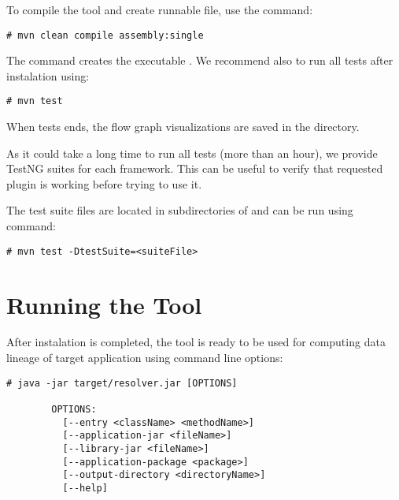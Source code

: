 To compile the \ToolName tool and create runnable  file, use the command:
\begin{lstlisting}[language=shell]
        # mvn clean compile assembly:single
\end{lstlisting}

The command creates the executable .
We recommend also to run all tests after instalation using:
\begin{lstlisting}[language=shell]
        # mvn test
\end{lstlisting}

When tests ends, the flow graph visualizations are saved in the  directory.

As it could take a long time to run all tests (more than an hour), we provide TestNG
suites for each framework. This can be useful to verify that requested plugin is working
before trying to use it.

The test suite files are located in subdirectories of 
and can be run using command:
\begin{lstlisting}[language=shell]
        # mvn test -DtestSuite=<suiteFile>
\end{lstlisting}


\section{Running the \ToolName Tool}

After instalation is completed, the \ToolName tool is ready to be used for computing
data lineage of target application using command line options:

\begin{lstlisting}[language=shell]
        # java -jar target/resolver.jar [OPTIONS]

        OPTIONS:
          [--entry <className> <methodName>]
          [--application-jar <fileName>]
          [--library-jar <fileName>]
          [--application-package <package>]
          [--output-directory <directoryName>]
          [--help]
\end{lstlisting}


